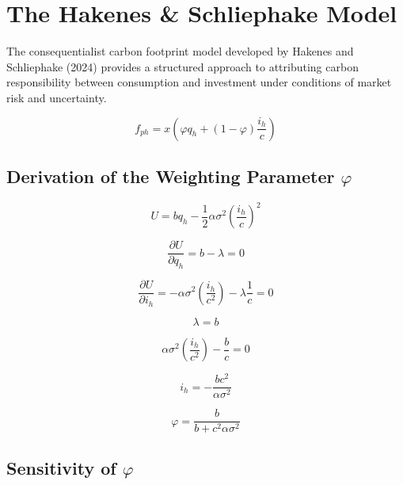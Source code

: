 \documentclass[12pt,a4paper]{article}
\begin{document}
\section*{The Hakenes \& Schliephake Model}

The consequentialist carbon footprint model developed by Hakenes and Schliephake (2024) provides a structured approach to attributing carbon responsibility between consumption and investment under conditions of market risk and uncertainty.

\begin{equation}
f_{ph} = x \left( \varphi q_h + (1 - \varphi) \frac{i_h}{c} \right)
\end{equation}

\subsection*{Derivation of the Weighting Parameter \texorpdfstring{$\varphi$}{phi}}

\begin{equation}
U = b q_h - \frac{1}{2} \alpha \sigma^2 \left( \frac{i_h}{c} \right)^2
\end{equation}

\begin{equation}
\frac{\partial U}{\partial q_h} = b - \lambda = 0
\end{equation}

\begin{equation}
\frac{\partial U}{\partial i_h} = - \alpha \sigma^2 \left( \frac{i_h}{c^2} \right) - \lambda \frac{1}{c} = 0
\end{equation}

\begin{equation}
\lambda = b
\end{equation}

\begin{equation}
\alpha \sigma^2 \left( \frac{i_h}{c^2} \right) - \frac{b}{c} = 0
\end{equation}

\begin{equation}
i_h = - \frac{b c^2}{\alpha \sigma^2}
\end{equation}

\begin{equation}
\varphi = \frac{b}{b + c^2 \alpha \sigma^2}
\end{equation}

\subsection*{Sensitivity of \texorpdfstring{$\varphi$}{phi}}
\end{document}
